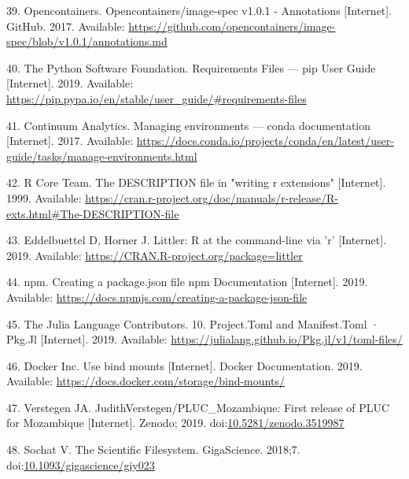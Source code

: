 \documentclass[10pt,letterpaper]{article}
\begin{document}
\leavevmode\hypertarget{ref-opencontainers_image-spec_2017}{}%
39. Opencontainers. Opencontainers/image-spec v1.0.1 - Annotations
{[}Internet{]}. GitHub. 2017. Available:
\url{https://github.com/opencontainers/image-spec/blob/v1.0.1/annotations.md}

\leavevmode\hypertarget{ref-the_python_software_foundation_requirements_2019}{}%
40. The Python Software Foundation. Requirements Files --- pip User
Guide {[}Internet{]}. 2019. Available:
\url{https://pip.pypa.io/en/stable/user_guide/\#requirements-files}

\leavevmode\hypertarget{ref-continuum_analytics_managing_2017}{}%
41. Continuum Analytics. Managing environments --- conda documentation
{[}Internet{]}. 2017. Available:
\url{https://docs.conda.io/projects/conda/en/latest/user-guide/tasks/manage-environments.html}

\leavevmode\hypertarget{ref-r_core_team_description_1999}{}%
42. R Core Team. The DESCRIPTION file in "writing r extensions"
{[}Internet{]}. 1999. Available:
\url{https://cran.r-project.org/doc/manuals/r-release/R-exts.html\#The-DESCRIPTION-file}

\leavevmode\hypertarget{ref-eddelbuettel_littler_2019}{}%
43. Eddelbuettel D, Horner J. Littler: R at the command-line via 'r'
{[}Internet{]}. 2019. Available:
\url{https://CRAN.R-project.org/package=littler}

\leavevmode\hypertarget{ref-npm_creating_2019}{}%
44. npm. Creating a package.json file npm Documentation {[}Internet{]}.
2019. Available:
\url{https://docs.npmjs.com/creating-a-package-json-file}

\leavevmode\hypertarget{ref-julia_tomls_2019}{}%
45. The Julia Language Contributors. 10. Project.Toml and Manifest.Toml
· Pkg.Jl {[}Internet{]}. 2019. Available:
\url{https://julialang.github.io/Pkg.jl/v1/toml-files/}

\leavevmode\hypertarget{ref-docker_use_2019}{}%
46. Docker Inc. Use bind mounts {[}Internet{]}. Docker Documentation.
2019. Available: \url{https://docs.docker.com/storage/bind-mounts/}

\leavevmode\hypertarget{ref-verstegen_pluc_mozambique_2019}{}%
47. Verstegen JA. JudithVerstegen/PLUC\_Mozambique: First release of
PLUC for Mozambique {[}Internet{]}. Zenodo; 2019.
doi:\href{https://doi.org/10.5281/zenodo.3519987}{10.5281/zenodo.3519987}

\leavevmode\hypertarget{ref-sochat_scientific_2018}{}%
48. Sochat V. The Scientific Filesystem. GigaScience. 2018;7.
doi:\href{https://doi.org/10.1093/gigascience/giy023}{10.1093/gigascience/giy023}
\end{document}
